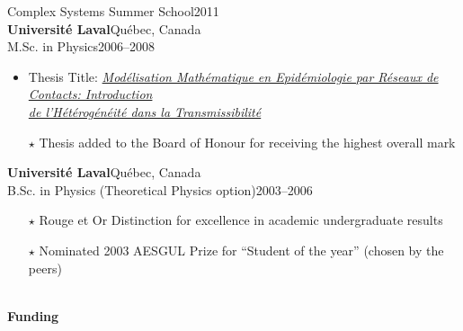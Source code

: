 \documentclass[11pt]{article}
\newcommand{\TitreSection}[1]{\colorbox{background}{\makebox[\textwidth-0.5em][c]{\Large\textrm{\textsc{#1}}}}\vspace{0.75\baselineskip}\\}
\begin{document}
Complex Systems Summer School\hfill 2011\\
%
\newpage\noindent%
\textbf{Universit\'e Laval}\hfill Qu\'ebec, Canada\\
M.Sc. in Physics\hfill 2006--2008
\begin{itemize}[leftmargin=1.5em]\small
  \item Thesis Title: \href{http://hdl.handle.net/20.500.11794/20317}{\textit{Mod\'elisation Math\'ematique en Epid\'emiologie par R\'eseaux de Contacts: Introduction\\de l'H\'et\'erog\'en\'eit\'e dans la Transmissibilit\'e}}\footnotemark
  \item[$\star$] Thesis added to the Board of Honour for receiving the highest overall mark
\end{itemize}
%
\textbf{Universit\'e Laval}\hfill Qu\'ebec, Canada\\
B.Sc. in Physics (Theoretical Physics option)\hfill 2003--2006
\begin{itemize}[leftmargin=1.5em]\small
  \item[$\star$] Rouge et Or Distinction for excellence in academic undergraduate results
  \item[$\star$] Nominated 2003 AESGUL Prize for ``Student of the year'' (chosen by the peers)
\end{itemize}
%
%
%
%
%
\TitreSection{Funding and Awards}
%
\textbf{Funding}
%
\end{document}
